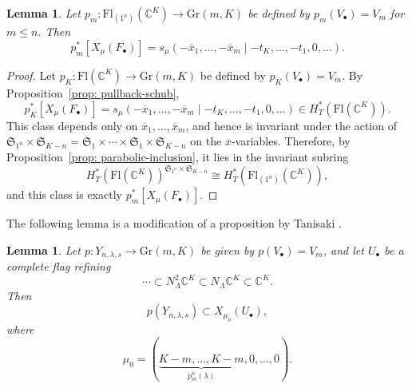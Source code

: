\documentclass[11pt]{amsart}
\numberwithin{equation}{section}
\newtheorem{lemma}[theorem]{Lemma}
\theoremstyle{definition}
\newcommand{\symm}{{\mathfrak{S}}}
\newcommand{\Gr}{{\mathrm {Gr}}}
\newcommand{\CC}{{\mathbb{C}}}
\newcommand{\Fl}{\text{Fl}}
\begin{document}
\begin{lemma}\label{lem: pullback-fl1nck-schur}
    Let $p_m:\Fl_{(1^n)}(\CC^K)\to \Gr(m,K)$ be defined by
    $p_m(V_\bullet)=V_m$ for $m\leq n$. Then
    \[
    p_m^*[X_\mu(F_\bullet)]
    =s_\mu(-\overline{x}_1,\dots,-\overline{x}_m\mid -t_K,\dots,-t_1,0,\dots).
    \]
\end{lemma}

\begin{proof}
Let $p_K:\Fl(\CC^K)\to \Gr(m,K)$ be defined by $p_K(V_\bullet)=V_m$. By
Proposition~\ref{prop: pullback-schub},
\[
p_K^*[X_\mu(F_\bullet)]
=s_\mu(-\overline{x}_1,\dots,-\overline{x}_m\mid -t_K,\dots,-t_1,0,\dots)
\in H_T^*(\Fl(\CC^K)).
\]
This class depends only on $\overline{x}_1,\dots,\overline{x}_m$, and hence is
invariant under the action of
$\symm_{1^n}\times \symm_{K-n}=\symm_1\times\cdots\times\symm_1\times\symm_{K-n}$
on the $\overline{x}$-variables. Therefore, by
Proposition~\ref{prop: parabolic-inclusion}, it lies in the invariant subring
\[
H_T^*(\Fl(\CC^K))^{\symm_{1^n}\times\symm_{K-n}}
\cong H_T^*(\Fl_{(1^n)}(\CC^K)),
\]
and this class is exactly $p_m^*[X_\mu(F_\bullet)]$.
\end{proof}

The following lemma is a modification of a proposition by Tanisaki \cite{T}.

\begin{lemma}\label{lem: ynls-inclusion-schub}
    Let $p:Y_{n,\lambda,s}\to \Gr(m,K)$ be given by $p(V_\bullet)=V_m$, and let
    $U_\bullet$ be a complete flag refining
    \[
    \cdots\subset N_\Lambda^2\CC^K\subset N_\Lambda\CC^K\subset \CC^K.
    \]
    Then
    \[
        p(Y_{n,\lambda,s})\subset X_{\mu_0}(U_\bullet),
    \]
    where
    \[
    \mu_0=(\underbrace{K-m,\dots,K-m}_{p_m^n(\lambda)},0,\dots,0).
    \]
\end{lemma}
\end{document}
